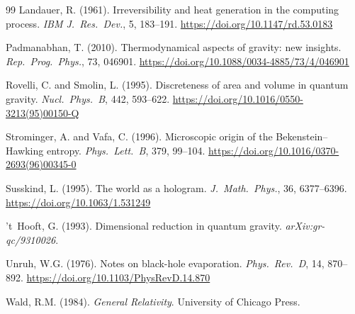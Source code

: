 \documentclass[12pt,a4paper]{article}
\begin{document}
\begin{thebibliography}{99}
Landauer, R. (1961).
Irreversibility and heat generation in the computing process.
\textit{IBM J.\ Res.\ Dev.}, 5, 183--191.
\url{https://doi.org/10.1147/rd.53.0183}

Padmanabhan, T. (2010).
Thermodynamical aspects of gravity: new insights.
\textit{Rep.\ Prog.\ Phys.}, 73, 046901.
\url{https://doi.org/10.1088/0034-4885/73/4/046901}

Rovelli, C. and Smolin, L. (1995).
Discreteness of area and volume in quantum gravity.
\textit{Nucl.\ Phys.\ B}, 442, 593--622.
\url{https://doi.org/10.1016/0550-3213(95)00150-Q}

Strominger, A. and Vafa, C. (1996).
Microscopic origin of the Bekenstein--Hawking entropy.
\textit{Phys.\ Lett.\ B}, 379, 99--104.
\url{https://doi.org/10.1016/0370-2693(96)00345-0}

Susskind, L. (1995).
The world as a hologram.
\textit{J.\ Math.\ Phys.}, 36, 6377--6396.
\url{https://doi.org/10.1063/1.531249}

't~Hooft, G. (1993).
Dimensional reduction in quantum gravity.
\textit{arXiv:gr-qc/9310026}.

Unruh, W.G. (1976).
Notes on black-hole evaporation.
\textit{Phys.\ Rev.\ D}, 14, 870--892.
\url{https://doi.org/10.1103/PhysRevD.14.870}

Wald, R.M. (1984).
\textit{General Relativity}.
University of Chicago Press.

\end{thebibliography}
\end{document}

